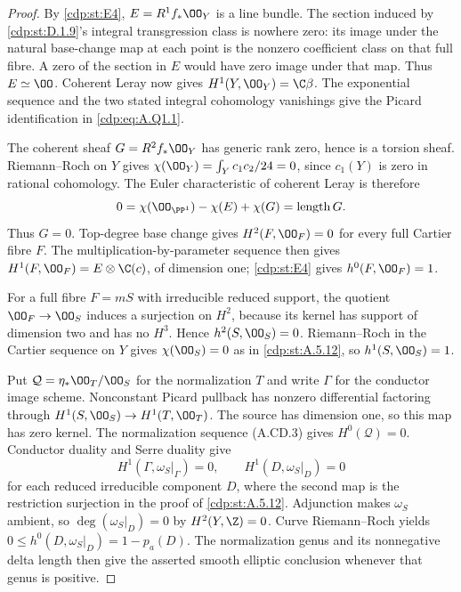 \begin{proof}
By \ref{cdp:st:E4}, $E=R^1f_*\OO_Y$ is a line bundle. The section
induced by \ref{cdp:st:D.1.9}'s integral transgression class is
nowhere zero: its image under the natural base-change
map at each point is the nonzero coefficient class on
that full fibre. A zero of the section in $E$ would
have zero image under that map. Thus $E\simeq\OO$.
Coherent Leray now gives $H^1(Y,\OO_Y)=\C\beta$.
The exponential sequence and the two stated integral
cohomology vanishings give the Picard identification
in \eqref{cdp:eq:A.Q1.1}.

The coherent sheaf $G=R^2f_*\OO_Y$ has generic rank
zero, hence is a torsion sheaf. Riemann--Roch on $Y$
gives $\chi(\OO_Y)=\int_Yc_1c_2/24=0$, since
$c_1(Y)$ is zero in rational cohomology. The Euler
characteristic of coherent Leray is therefore
\[
 0=\chi(\OO_{\PP^1})-\chi(E)+\chi(G)
      =\operatorname{length}G.
\]
Thus $G=0$. Top-degree base change gives
$H^2(F,\OO_F)=0$ for every full Cartier fibre $F$.
The multiplication-by-parameter sequence then gives
$H^1(F,\OO_F)=E\otimes\C(c)$, of dimension one;
\ref{cdp:st:E4} gives $h^0(F,\OO_F)=1$.

For a full fibre $F=mS$ with irreducible reduced
support, the quotient $\OO_F\to\OO_S$ induces a
surjection on $H^2$, because its kernel has support
of dimension two and has no $H^3$.
Hence $h^2(S,\OO_S)=0$. Riemann--Roch in the Cartier
sequence on $Y$ gives $\chi(\OO_S)=0$ as in \ref{cdp:st:A.5.12},
so $h^1(S,\OO_S)=1$.

Put $\mathcal Q=\eta_*\OO_T/\OO_S$ for the
normalization $T$ and write $\Gamma$ for the conductor
image scheme. Nonconstant Picard pullback has nonzero
differential factoring through
$H^1(S,\OO_S)\to H^1(T,\OO_T)$.
The source has dimension one, so this map has zero
kernel. The normalization sequence (A.CD.3) gives
$H^0(\mathcal Q)=0$. Conductor duality and Serre
duality give
\[
 H^1(\Gamma,\omega_S|_\Gamma)=0,
 \qquad H^1(D,\omega_S|_D)=0                      \tag{A.Q1.2}\label{cdp:eq:A.Q1.2}
\]
for each reduced irreducible component $D$, where
the second map is the restriction surjection in the
proof of \ref{cdp:st:A.5.12}. Adjunction makes $\omega_S$ ambient,
so $\deg(\omega_S|_D)=0$ by $H^2(Y,\Z)=0$.
Curve Riemann--Roch yields
$0\le h^0(D,\omega_S|_D)=1-p_a(D)$.
The normalization genus and its nonnegative delta
length then give the asserted smooth elliptic
conclusion whenever that genus is positive.
\end{proof}


